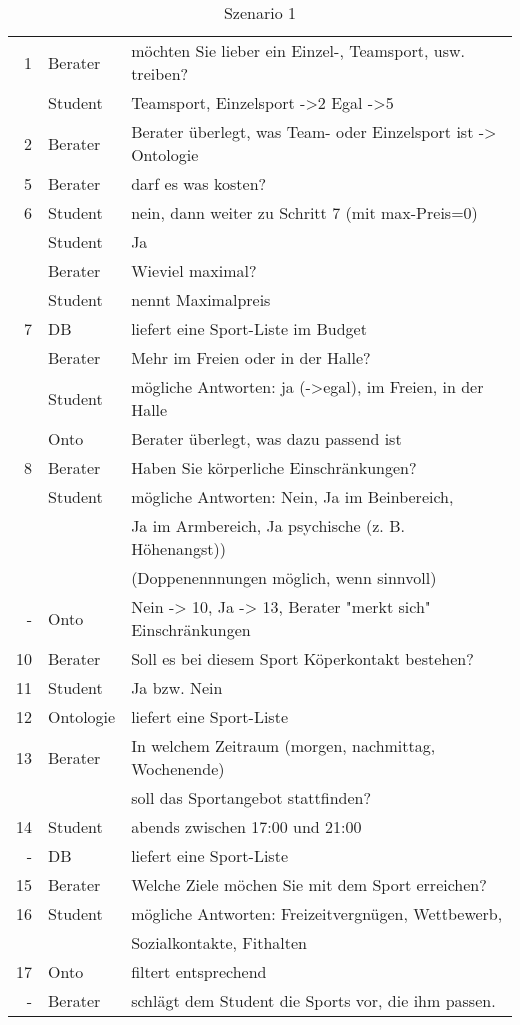 \begin{table}
	\centering
		\begin{tabular}{|r|l|l|}
\hline
			
1 &	Berater &	möchten Sie lieber ein Einzel-, Teamsport, usw. treiben? \\
&	Student	& Teamsport, Einzelsport ->2 Egal ->5 \\
\hline
2	& Berater	& Berater überlegt, was Team- oder Einzelsport ist -> Ontologie \\
\hline
5 &	Berater &	darf es was kosten? \\
\hline
6 &	Student	& nein, dann weiter zu Schritt 7 (mit max-Preis=0) \\
	& Student	& Ja \\
	& Berater	& Wieviel maximal?\\
	& Student &	nennt Maximalpreis\\
\hline
7	& DB &	 liefert eine Sport-Liste im Budget\\
	& Berater &	Mehr im Freien oder in der Halle?\\
	& Student &	mögliche Antworten: ja (->egal), im Freien, in der Halle\\
	& Onto & Berater überlegt, was dazu passend ist\\
\hline
8	& Berater &	Haben Sie körperliche Einschränkungen?\\
	& Student &	mögliche Antworten: Nein, Ja im Beinbereich,\\
	& & Ja im Armbereich, Ja psychische (z. B. Höhenangst)) \\ 
	&&(Doppenennnungen möglich, wenn sinnvoll)\\
\hline
-	& Onto & Nein -> 10, Ja -> 13, Berater "merkt sich" Einschränkungen \\
\hline
10 & Berater & Soll es bei diesem Sport Köperkontakt bestehen?\\
\hline
11 & Student & Ja bzw. Nein\\
\hline
12 & Ontologie & liefert eine Sport-Liste\\
\hline
13 & Berater & In welchem Zeitraum (morgen, nachmittag, Wochenende)\\
&& soll das Sportangebot stattfinden?\\
\hline
14 & Student & abends zwischen 17:00 und 21:00 \\
\hline
-	& DB &liefert eine Sport-Liste\\
\hline
15 & Berater & Welche Ziele möchen Sie mit dem Sport erreichen?\\
\hline
16 & Student & mögliche Antworten: Freizeitvergnügen, Wettbewerb,\\
&& Sozialkontakte, Fithalten\\
\hline
17 & Onto &	filtert entsprechend \\
\hline
-	& Berater &	schlägt dem Student die Sports vor, die ihm passen.\\
\hline
		\end{tabular}
		
		\caption[Szenario 1]{Szenario 1}
\end{table}


